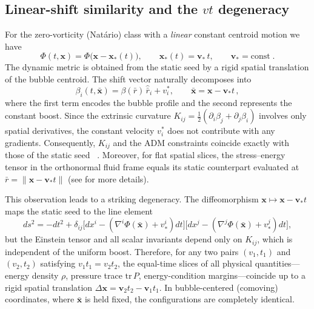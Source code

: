 \documentclass[11pt]{article}
\begin{document}
\subsection{Linear-shift similarity and the \texorpdfstring{$vt$}{vt} degeneracy}
\label{sec:vt-similarity}
For the zero-vorticity (Nat\'ario) class with a \emph{linear} constant centroid motion we have
\begin{equation}
    \Phi(t,\mathbf x)=\Phi\big(\mathbf x-\mathbf x_*(t)\big),\qquad \mathbf x_*(t)=\mathbf v_*\,t,\qquad \mathbf v_* = \text{const}\;.
\end{equation}
The dynamic metric is obtained from the static seed by a rigid spatial translation of the bubble centroid. The shift vector naturally decomposes into
\begin{equation}
    \beta_i(t,\bar{\mathbf x})=\beta(\bar r)\,\hat{\bar r}_i + v^*_{i},\qquad \bar{\mathbf x}=\mathbf x-\mathbf v_* t\,,
\end{equation}
where the first term encodes the bubble profile and the second represents the constant boost. Since the extrinsic curvature $K_{ij}=\tfrac12(\partial_i\beta_j+\partial_j\beta_i)$ involves only spatial derivatives, the constant velocity $v^*_i$ does not contribute with any gradients. Consequently, $K_{ij}$ and the ADM constraints coincide exactly with those of the static seed ~\cite{Arnowitt:1962hi,Wald1984ucp,Alcub2008itnr}. Moreover, for flat spatial slices, the stress--energy tensor in the orthonormal fluid frame equals its static counterpart evaluated at $\bar r=\|\mathbf x-\mathbf v_* t\|$ (see \cite{Santiago:2021aup,Schuster:2023ADMmass} for more details).

This observation leads to a striking degeneracy. The diffeomorphism $\mathbf x\mapsto\mathbf x-\mathbf v_* t$ maps the static seed to the line element
\[
ds^2=-dt^2+\delta_{ij}\big[dx^i-(\nabla^i\Phi(\bar{\mathbf x})+v_*^i)dt\big]\big[dx^j-(\nabla^j\Phi(\bar{\mathbf x})+v_*^j)dt\big],
\]
but the Einstein tensor and all scalar invariants depend only on $K_{ij}$, which is independent of the uniform boost. Therefore, for any two pairs $(v_1,t_1)$ and $(v_2,t_2)$ satisfying $v_1 t_1=v_2 t_2$, the equal-time slices of all physical quantities---energy density $\rho$, pressure trace $\mathrm{tr}\,P$, energy-condition margins---coincide up to a rigid spatial translation $\Delta\mathbf x=\mathbf v_2 t_2-\mathbf v_1 t_1$. In bubble-centered (comoving) coordinates, where $\bar{\mathbf x}$ is held fixed, the configurations are completely identical.
\end{document}
